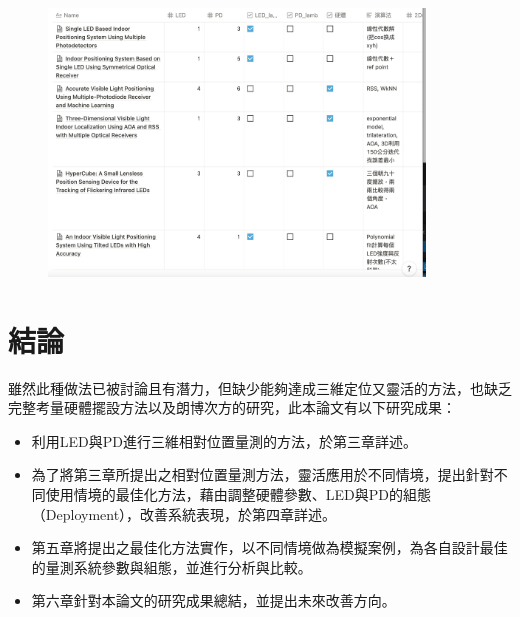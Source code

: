         \begin{figure}[ht]
            \centering
            \includegraphics[width=10cm]{00temppic/temp.png}
        \end{figure}



\section{結論}

雖然此種做法已被討論且有潛力，但缺少能夠達成三維定位又靈活的方法，也缺乏完整考量硬體擺設方法以及朗博次方的研究，此本論文有以下研究成果：
\begin{itemize}
    \item 利用LED與PD進行三維相對位置量測的方法，於第三章詳述。
    \item 為了將第三章所提出之相對位置量測方法，靈活應用於不同情境，提出針對不同使用情境的最佳化方法，藉由調整硬體參數、LED與PD的組態（Deployment），改善系統表現，於第四章詳述。
    \item 第五章將提出之最佳化方法實作，以不同情境做為模擬案例，為各自設計最佳的量測系統參數與組態，並進行分析與比較。
    \item 第六章針對本論文的研究成果總結，並提出未來改善方向。
\end{itemize}